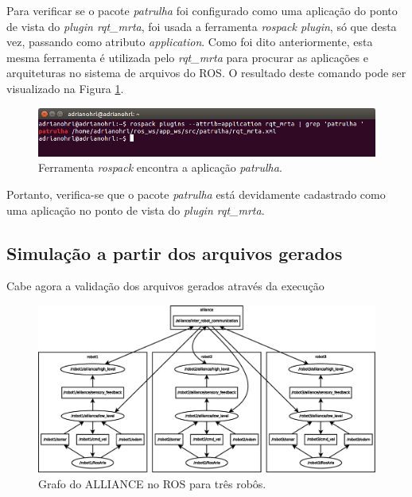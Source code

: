             Para verificar se o pacote \textit{patrulha} foi configurado como uma aplicação do ponto de vista do \textit{plugin rqt\_mrta}, foi usada a ferramenta \textit{rospack plugin}, só que desta vez, passando como atributo \textit{application}. Como foi dito anteriormente, esta mesma ferramenta é utilizada pelo \textit{rqt\_mrta} para procurar as aplicações e arquiteturas no sistema de arquivos do ROS. O resultado deste comando pode ser visualizado na Figura \ref{fig:rospack_patrulha}.
        
            \begin{figure}[htb]
                \centering
                \includegraphics[width=.95\textwidth]{Figuras/4_resultados/rqt_mrta_patrulha.png}
                \caption{Ferramenta \textit{rospack} encontra a aplicação \textit{patrulha}.} \label{fig:rospack_patrulha}
            \end{figure}
            
            Portanto, verifica-se que o pacote \textit{patrulha} está devidamente cadastrado como uma aplicação no ponto de vista do \textit{plugin rqt\_mrta}.
            
        \subsection{Simulação a partir dos arquivos gerados} \label{subsec:sim_patrulha}
            Cabe agora a validação dos arquivos gerados através da execução 
        
            \begin{figure}[p]
                \centering
                \includegraphics[width=.97\textheight,angle=90]{Figuras/4_resultados/rosgraph_3robots.eps}
                \caption{Grafo do ALLIANCE no ROS para três robôs.} \label{fig:ros_graph_alliance}
            \end{figure}
        
        
    
        